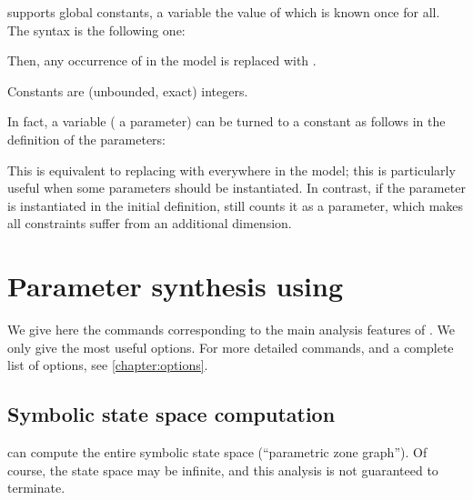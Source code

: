 \imitator{} supports global constants, \ie{} a variable the value of which is known once for all.
The syntax is the following one:
	\begin{center}
	\end{center}
Then, any occurrence of  in the model is replaced with .

Constants are (unbounded, exact) integers.


\begin{hint}
	In fact, a variable (\eg{} a parameter) can be turned to a constant as follows in the definition of the parameters:
	\begin{center}
	\end{center}
	This is equivalent to replacing  with  everywhere in the model; this is particularly useful when some parameters should be instantiated.
	In contrast, if the parameter is instantiated in the initial definition, \imitator{} still counts it as a parameter, which makes all constraints suffer from an additional dimension.
\end{hint}





\chapter{Parameter synthesis using \imitator{}}


We give here the commands corresponding to the main analysis features of \imitator{}.
We only give the most useful options.
For more detailed commands, and a complete list of options, see \cref{chapter:options}.


\section{Symbolic state space computation}\label{ss:mode:statespace}

\imitator{} can compute the entire symbolic state space (``parametric zone graph'').
Of course, the state space may be infinite, and this analysis is not guaranteed to terminate.

